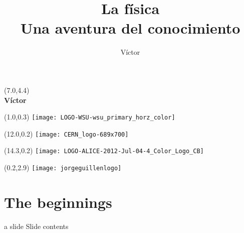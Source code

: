 \documentclass[14pt,aspectratio=169,t]{beamer}
\title{\LARGE \textbf{La física\\Una aventura del conocimiento}}
\author{Víctor}
\date{}
\begin{document}
\begin{frame}{}
  \begin{textblock}{8}(7.0,4.4)
  {}\\
  \vspace{0.1in}
  {\large \textbf{Víctor}}
  \end{textblock}
  
  \begin{textblock}{12}(1.0,0.3)
      \texttt{[image: LOGO-WSU-wsu\_primary\_horz\_color]}
  \end{textblock}
  \begin{textblock}{10}(12.0,0.2)
      \texttt{[image: CERN\_logo-689x700]}
  \end{textblock}
  \begin{textblock}{10}(14.3,0.2)
      \texttt{[image: LOGO-ALICE-2012-Jul-04-4\_Color\_Logo\_CB]}
  \end{textblock}
  \begin{textblock}{10}(0.2,2.9)
      \texttt{[image: jorgeguillenlogo]}
  \end{textblock}
\end{frame}

\section{The beginnings}

\begin{frame}{a slide}
  Slide contents
\end{frame}
\end{document}

